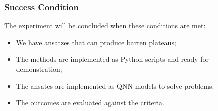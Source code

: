 \subsubsection{Success Condition}
The experiment will be concluded when these conditions are met:
\begin{itemize}
    \item We have ansatzes that can produce barren plateaus;
    \item The methods are implemented as Python scripts and ready for demonstration;
    \item The ansates are implemented as QNN models to solve problems.
    \item The outcomes are evaluated against the criteria.
\end{itemize}